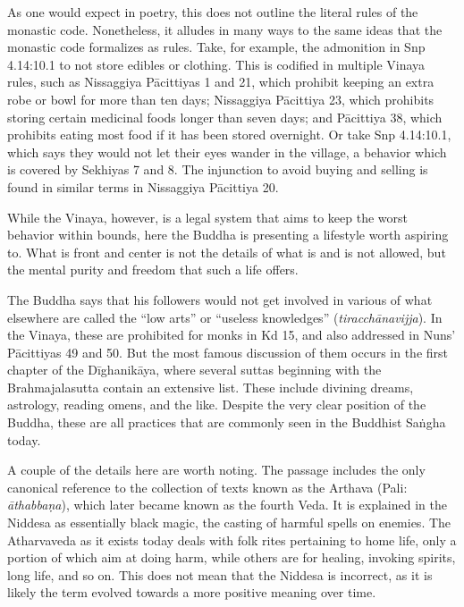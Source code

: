 \documentclass[12pt,openany]{book}%
\begin{document}
As one would expect in poetry, this does not outline the literal rules of the monastic code. Nonetheless, it alludes in many ways to the same ideas that the monastic code formalizes as rules. Take, for example, the admonition in Snp 4.14:10.1 to not store edibles or clothing. This is codified in multiple Vinaya rules, such as Nissaggiya \textsanskrit{Pācittiyas} 1 and 21, which prohibit keeping an extra robe or bowl for more than ten days; Nissaggiya \textsanskrit{Pācittiya} 23, which prohibits storing certain medicinal foods longer than seven days; and \textsanskrit{Pācittiya} 38, which prohibits eating most food if it has been stored overnight. Or take Snp 4.14:10.1, which says they would not let their eyes wander in the village, a behavior which is covered by Sekhiyas 7 and 8. The injunction to avoid buying and selling is found in similar terms in Nissaggiya \textsanskrit{Pācittiya} 20.

While the Vinaya, however, is a legal system that aims to keep the worst behavior within bounds, here the Buddha is presenting a lifestyle worth aspiring to. What is front and center is not the details of what is and is not allowed, but the mental purity and freedom that such a life offers.

The Buddha says that his followers would not get involved in various of what elsewhere are called the “low arts” or “useless knowledges” (\textit{\textsanskrit{tiracchānavijja}}). In the Vinaya, these are prohibited for monks in Kd 15, and also addressed in Nuns’ \textsanskrit{Pācittiyas} 49 and 50. But the most famous discussion of them occurs in the first chapter of the \textsanskrit{Dīghanikāya}, where several suttas beginning with the Brahmajalasutta contain an extensive list. These include divining dreams, astrology, reading omens, and the like. Despite the very clear position of the Buddha, these are all practices that are commonly seen in the Buddhist \textsanskrit{Saṅgha} today.

A couple of the details here are worth noting. The passage includes the only canonical reference to the collection of texts known as the Arthava (Pali: \textit{\textsanskrit{āthabbaṇa}}), which later became known as the fourth Veda. It is explained in the Niddesa as essentially black magic, the casting of harmful spells on enemies. The Atharvaveda as it exists today deals with folk rites pertaining to home life, only a portion of which aim at doing harm, while others are for healing, invoking spirits, long life, and so on. This does not mean that the Niddesa is incorrect, as it is likely the term evolved towards a more positive meaning over time.
\end{document}
